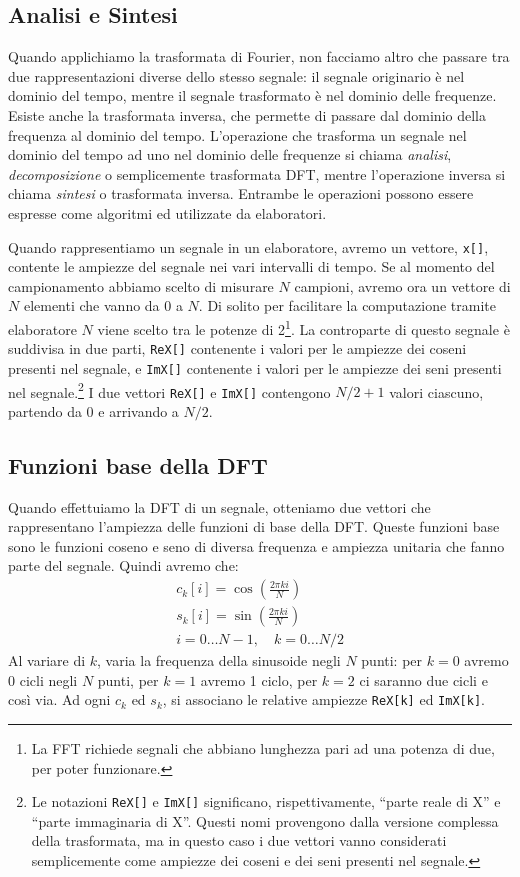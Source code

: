\subsection{Analisi e Sintesi}
Quando applichiamo la trasformata di Fourier, non facciamo altro che passare tra
due rappresentazioni diverse dello stesso segnale: il segnale originario \`e nel
dominio del tempo, mentre il segnale trasformato \`e nel dominio delle
frequenze. Esiste anche la trasformata inversa, che permette di passare dal
dominio della frequenza al dominio del tempo.
L'operazione che trasforma un segnale nel dominio del tempo ad uno nel dominio
delle frequenze si chiama \emph{analisi}, \emph{decomposizione} o semplicemente
{trasformata DFT}, mentre l'operazione inversa si chiama \emph{sintesi} o
{trasformata inversa}. Entrambe le operazioni possono essere espresse come
algoritmi ed utilizzate da elaboratori.

Quando rappresentiamo un segnale in un elaboratore, avremo un vettore,
\texttt{x[]}, contente le ampiezze del segnale nei vari intervalli di tempo. Se
al momento del campionamento abbiamo scelto di misurare $N$ campioni, avremo ora
un vettore di $N$ elementi che vanno da 0 a $N$. Di solito per facilitare la
computazione tramite elaboratore $N$ viene scelto tra le potenze di
2\footnote{La FFT richiede segnali che abbiano lunghezza pari ad una potenza di
due, per poter funzionare.}. La controparte di questo segnale \`e suddivisa in
due parti, \texttt{ReX[]} contenente i valori per le ampiezze dei coseni
presenti nel segnale, e \texttt{ImX[]} contenente i valori per le ampiezze dei
seni presenti nel segnale.\footnote{Le notazioni \texttt{ReX[]} e \texttt{ImX[]}
significano, rispettivamente, ``parte reale di X'' e ``parte immaginaria di X''.
Questi nomi provengono dalla versione complessa della trasformata, ma in questo
caso i due vettori vanno considerati semplicemente come ampiezze dei coseni e
dei seni presenti nel segnale.} I due vettori \texttt{ReX[]} e \texttt{ImX[]}
contengono $N/2 + 1$ valori ciascuno, partendo da 0 e arrivando a $N/2$.

\subsection{Funzioni base della DFT}
Quando effettuiamo la DFT di un segnale, otteniamo due vettori che rappresentano
l'ampiezza delle funzioni di base della DFT. Queste funzioni base sono le
funzioni coseno e seno di diversa frequenza e ampiezza unitaria che fanno parte
del segnale. Quindi avremo che:
\[
\begin{array}{c}
c_k[i] = \cos\left(\frac{2\pi ki}{N}\right)\\[0.5em]
s_k[i] = \sin\left(\frac{2\pi ki}{N}\right)\\[0.5em]
i = 0\dots N-1, \quad k = 0 \dots N/2
\end{array}
\]
Al variare di $k$, varia la frequenza della sinusoide negli $N$ punti: per $k =
0$ avremo $0$ cicli negli $N$ punti, per $k=1$ avremo 1 ciclo, per $k=2$ ci
saranno due cicli e cos\`i via. Ad ogni $c_k$ ed $s_k$, si associano le relative
ampiezze \texttt{ReX[k]} ed \texttt{ImX[k]}.


